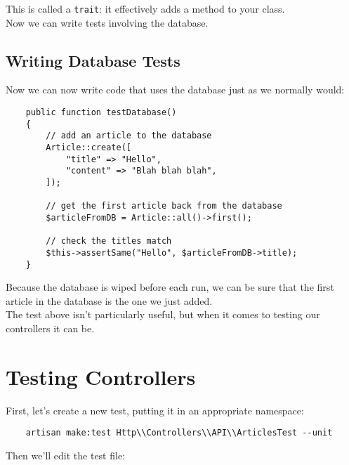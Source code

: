 This is called a \texttt{trait}: it effectively adds a method to your class.
\\

Now we can write tests involving the database.


\subsection{Writing Database Tests}

Now we can now write code that uses the database just as we normally would:

\begin{verbatim}
    public function testDatabase()
    {
        // add an article to the database
        Article::create([
            "title" => "Hello",
            "content" => "Blah blah blah",
        ]);

        // get the first article back from the database
        $articleFromDB = Article::all()->first();

        // check the titles match
        $this->assertSame("Hello", $articleFromDB->title);
    }
\end{verbatim}

Because the database is wiped before each run, we can be sure that the first article in the database is the one we just added.
\\

The test above isn't particularly useful, but when it comes to testing our controllers it can be.


\pagebreak


\section{Testing Controllers}

First, let's create a new test, putting it in an appropriate namespace:

\begin{verbatim}
    artisan make:test Http\\Controllers\\API\\ArticlesTest --unit
\end{verbatim}

Then we'll edit the test file:

